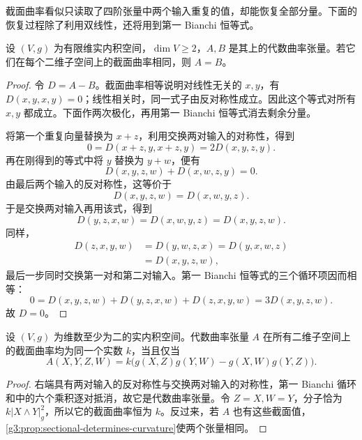 截面曲率看似只读取了四阶张量中两个输入重复的值，却能恢复全部分量。下面的恢复过程除了利用双线性，还将用到第一 Bianchi 恒等式。

\begin{proposition}
	\label{g3:prop:sectional-determines-curvature}
	设 \((V,g)\) 为有限维实内积空间，\(\dim V\geq2\)，\(A,B\) 是其上的代数曲率张量。若它们在每个二维子空间上的截面曲率相同，则 \(A=B\)。
\end{proposition}
\begin{proof}
	令 \(D=A-B\)。截面曲率相等说明对线性无关的 \(x,y\)，有 \(D(x,y,x,y)=0\)；线性相关时，同一式子由反对称性成立。因此这个等式对所有 \(x,y\) 都成立。下面作两次极化，再用第一 Bianchi 恒等式消去剩余分量。

	将第一个重复向量替换为 \(x+z\)，利用交换两对输入的对称性，得到
	\[
		0=D(x+z,y,x+z,y)=2D(x,y,z,y).
	\]
	再在刚得到的等式中将 \(y\) 替换为 \(y+w\)，便有
	\[
		D(x,y,z,w)+D(x,w,z,y)=0.
	\]
	由最后两个输入的反对称性，这等价于
	\begin{equation}
		\label{g3:eq:sectional-zero-polarization}
		D(x,y,z,w)=D(x,w,y,z).
	\end{equation}
	于是交换两对输入再用该式，得到
	\[
		D(y,z,x,w)=D(x,w,y,z)=D(x,y,z,w).
	\]
	同样，
	\[
		\begin{aligned}
			D(z,x,y,w)&=D(y,w,z,x)=D(y,x,w,z)\\
			&=D(x,y,z,w),
		\end{aligned}
	\]
	最后一步同时交换第一对和第二对输入。第一 Bianchi 恒等式的三个循环项因而相等：
	\[
		0=D(x,y,z,w)+D(y,z,x,w)+D(z,x,y,w)
		=3D(x,y,z,w).
	\]
	故 \(D=0\)。
\end{proof}

\begin{corollary}
	\label{g3:cor:pointwise-isotropic-curvature}
	设 \((V,g)\) 为维数至少为二的实内积空间。代数曲率张量 \(A\) 在所有二维子空间上的截面曲率均为同一个实数 \(k\)，当且仅当
	\begin{equation}
		\label{g3:eq:constant-sectional-algebraic}
		A(X,Y,Z,W)
		=k\bigl(g(X,Z)g(Y,W)-g(X,W)g(Y,Z)\bigr).
	\end{equation}
\end{corollary}
\begin{proof}
	右端具有两对输入的反对称性与交换两对输入的对称性，第一 Bianchi 循环和中的六个乘积逐对抵消，故它是代数曲率张量。令 \(Z=X,W=Y\)，分子恰为 \(k|X\wedge Y|_g^2\)，所以它的截面曲率恒为 \(k\)。反过来，若 \(A\) 也有这些截面值，\cref{g3:prop:sectional-determines-curvature}使两个张量相同。
\end{proof}

